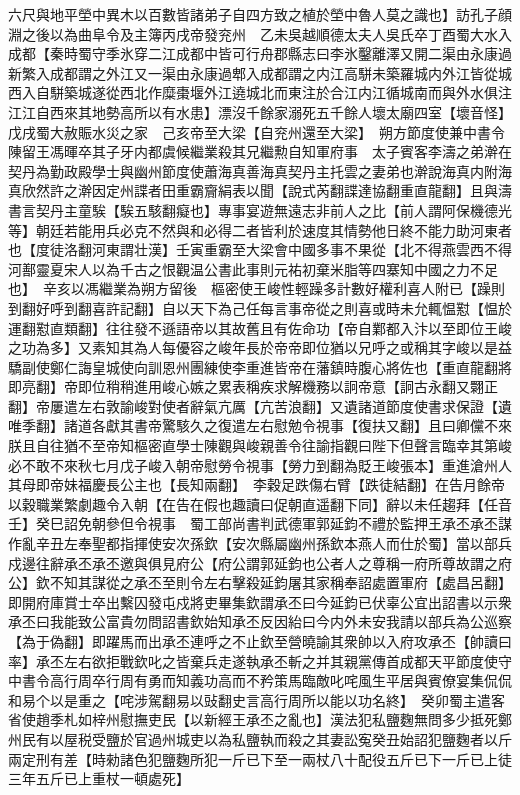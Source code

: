 六尺與地平塋中異木以百數皆諸弟子自四方致之植於塋中魯人莫之識也】訪孔子顔淵之後以為曲阜令及主簿丙戌帝發兖州　乙未吳越順德太夫人吳氏卒丁酉蜀大水入成都【秦時蜀守季氷穿二江成都中皆可行舟郡縣志曰李氷鑿離澤又開二渠由永康過新繁入成都謂之外江又一渠由永康過郫入成都謂之内江高駢未築羅城内外江皆從城西入自駢築城遂從西北作糜棗堰外江遶城北而東注於合江内江循城南而與外水俱注江江自西來其地勢高所以有水患】漂沒千餘家溺死五千餘人壞太廟四室【壞音怪】戊戌蜀大赦賑水災之家　己亥帝至大梁【自兖州還至大梁】　朔方節度使兼中書令陳留王馮暉卒其子牙内都虞候繼業殺其兄繼勲自知軍府事　太子賓客李濤之弟澣在契丹為勤政殿學士與幽州節度使蕭海真善海真契丹主托雲之妻弟也澣說海真内附海真欣然許之澣因定州諜者田重霸齎絹表以聞【說式芮翻諜達協翻重直龍翻】且與濤書言契丹主童騃【騃五駭翻癡也】專事宴遊無遠志非前人之比【前人謂阿保機德光等】朝廷若能用兵必克不然與和必得二者皆利於速度其情勢他日終不能力助河東者也【度徒洛翻河東謂壮漢】壬寅重霸至大梁會中國多事不果從【北不得燕雲西不得河鄯靈夏宋人以為千古之恨觀温公書此事則元祐初棄米脂等四寨知中國之力不足也】　辛亥以馮繼業為朔方留後　樞密使王峻性輕躁多計數好權利喜人附已【躁則到翻好呼到翻喜許記翻】自以天下為己任每言事帝從之則喜或時未允輒愠懟【愠於運翻懟直類翻】往往發不遜語帝以其故舊且有佐命功【帝自鄴都入汴以至即位王峻之功為多】又素知其為人每優容之峻年長於帝帝即位猶以兄呼之或稱其字峻以是益驕副使鄭仁誨皇城使向訓恩州團練使李重進皆帝在藩鎮時腹心將佐也【重直龍翻將即亮翻】帝即位稍稍進用峻心嫉之累表稱疾求解機務以詗帝意【詗古永翻又翾正翻】帝屢遣左右敦諭峻對使者辭氣亢厲【亢苦浪翻】又遺諸道節度使書求保證【遺唯季翻】諸道各獻其書帝驚駭久之復遣左右慰勉令視事【復扶又翻】且曰卿儻不來朕且自往猶不至帝知樞密直學士陳觀與峻親善令往諭指觀曰陛下但聲言臨幸其第峻必不敢不來秋七月戊子峻入朝帝慰勞令視事【勞力到翻為貶王峻張本】重進滄州人其母即帝妹福慶長公主也【長知兩翻】　李穀足跌傷右臂【跌徒結翻】在告月餘帝以穀職業繁劇趣令入朝【在告在假也趣讀曰促朝直遥翻下同】辭以未任趨拜【任音壬】癸巳詔免朝參但令視事　蜀工部尚書判武德軍郭延鈞不禮於監押王承丕承丕謀作亂辛丑左奉聖都指揮使安次孫欽【安次縣屬幽州孫欽本燕人而仕於蜀】當以部兵戍邊往辭承丕承丕邀與俱見府公【府公謂郭延鈞也公者人之尊稱一府所尊故謂之府公】欽不知其謀從之承丕至則令左右擊殺延鈞屠其家稱奉詔處置軍府【處昌呂翻】即開府庫賞士卒出繫囚發屯戍將吏畢集欽謂承丕曰今延鈞已伏辜公宜出詔書以示衆承丕曰我能致公富貴勿問詔書欽始知承丕反因紿曰今内外未安我請以部兵為公巡察【為于偽翻】即躍馬而出承丕連呼之不止欽至營曉諭其衆帥以入府攻承丕【帥讀曰率】承丕左右欲拒戰欽叱之皆棄兵走遂執承丕斬之并其親黨傳首成都天平節度使守中書令高行周卒行周有勇而知義功高而不矜策馬臨敵叱咤風生平居與賓僚宴集侃侃和易个以是重之【咤涉駕翻易以䜴翻史言高行周所以能以功名終】　癸卯蜀主遣客省使趙季札如梓州慰撫吏民【以新經王承丕之亂也】漢法犯私鹽麴無問多少抵死鄭州民有以屋税受鹽於官過州城吏以為私鹽執而殺之其妻訟寃癸丑始詔犯鹽麴者以斤兩定刑有差【時勑諸色犯鹽麴所犯一斤已下至一兩杖八十配役五斤已下一斤已上徒三年五斤已上重杖一頓處死】


